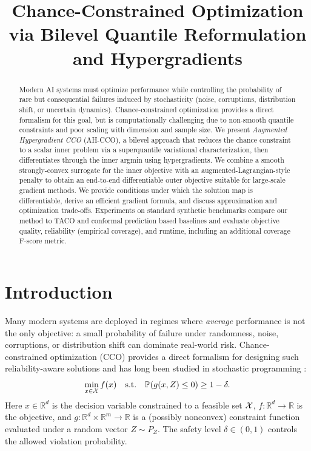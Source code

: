 \documentclass{uai2026} %
\title{Chance-Constrained Optimization via Bilevel Quantile Reformulation and Hypergradients}
\theoremstyle{plain}
\theoremstyle{definition}
\begin{document}
\maketitle

\begin{abstract}
Modern AI systems must optimize performance while controlling the probability of rare but consequential failures induced by stochasticity (noise, corruptions, distribution shift, or uncertain dynamics). Chance-constrained optimization provides a direct formalism for this goal, but is computationally challenging due to non-smooth quantile constraints and poor scaling with dimension and sample size.
We present \emph{Augmented Hypergradient CCO} (AH-CCO), a bilevel approach that reduces the chance constraint to a scalar inner problem via a superquantile variational characterization, then differentiates through the inner argmin using hypergradients. We combine a smooth strongly-convex surrogate for the inner objective with an augmented-Lagrangian-style penalty to obtain an end-to-end differentiable outer objective suitable for large-scale gradient methods.
We provide conditions under which the solution map is differentiable, derive an efficient gradient formula, and discuss approximation and optimization trade-offs. Experiments on standard synthetic benchmarks compare our method to TACO and conformal prediction based baselines and evaluate objective quality, reliability (empirical coverage), and runtime, including an additional coverage F-score metric.
\end{abstract}

\section{Introduction}\label{sec:intro}
Many modern systems are deployed in regimes where \emph{average} performance is not the only objective: a small probability of failure under randomness, noise, corruptions, or distribution shift can dominate real-world risk.
Chance-constrained optimization (CCO) provides a direct formalism for designing such reliability-aware solutions and has long been studied in stochastic programming \citep{prekopa1995stochastic,shapiro2009lectures}:
\begin{equation}\label{eq:intro-cco}
  \min_{x\in\mathcal{X}} f(x)
  \quad\text{s.t.}\quad
  \mathbb{P}\!\left(g(x,Z)\le 0\right)\ge 1-\delta.
\end{equation}
Here $x\in\mathbb{R}^d$ is the decision variable constrained to a feasible set $\mathcal{X}$, $f:\mathbb{R}^d\to\mathbb{R}$ is the objective, and $g:\mathbb{R}^d\times\mathbb{R}^m\to\mathbb{R}$ is a (possibly nonconvex) constraint function evaluated under a random vector $Z\sim P_Z$.
The safety level $\delta\in(0,1)$ controls the allowed violation probability.
\end{document}
